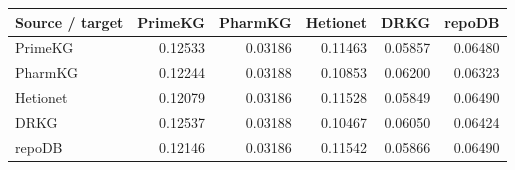 \begin{tabular}{lrrrrr}
\toprule
Source / target & PrimeKG & PharmKG & Hetionet & DRKG & repoDB \\
\midrule
PrimeKG & 0.12533 & 0.03186 & 0.11463 & 0.05857 & 0.06480 \\
PharmKG & 0.12244 & 0.03188 & 0.10853 & 0.06200 & 0.06323 \\
Hetionet & 0.12079 & 0.03186 & 0.11528 & 0.05849 & 0.06490 \\
DRKG & 0.12537 & 0.03188 & 0.10467 & 0.06050 & 0.06424 \\
repoDB & 0.12146 & 0.03186 & 0.11542 & 0.05866 & 0.06490 \\
\bottomrule
\end{tabular}
